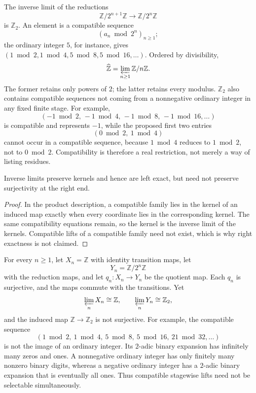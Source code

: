 \begin{example}
The inverse limit of the reductions
\[
\mathbb Z/2^{n+1}\mathbb Z\longrightarrow\mathbb Z/2^n\mathbb Z
\]
is \(\mathbb Z_2\).  An element is a compatible sequence
\[
(a_n\bmod2^n)_{n\geq1};
\]
the ordinary integer \(5\), for instance, gives
\((1\bmod2,1\bmod4,5\bmod8,5\bmod16,\ldots)\).  Ordered by divisibility,
\[
\widehat{\mathbb Z}=\varprojlim_{n\geq1}\mathbb Z/n\mathbb Z.
\]
The former retains only powers of \(2\); the latter retains every modulus.
\(\mathbb Z_2\) also contains compatible sequences not coming from a
nonnegative ordinary integer in any fixed finite stage.  For example,
\[
(-1\bmod2,\,-1\bmod4,\,-1\bmod8,\,-1\bmod16,\ldots)
\]
is compatible and represents \(-1\), while the proposed first two entries
\[
(0\bmod2,\ 1\bmod4)
\]
cannot occur in a compatible sequence, because \(1\bmod4\) reduces to
\(1\bmod2\), not to \(0\bmod2\).  Compatibility is therefore a real
restriction, not merely a way of listing residues.
\end{example}

\begin{proposition}
Inverse limits preserve kernels and hence are left exact, but need not
preserve surjectivity at the right end.
\end{proposition}
\begin{proof}
In the product description, a compatible family lies in the kernel of an
induced map exactly when every coordinate lies in the corresponding kernel.
The same compatibility equations remain, so the kernel is the inverse limit
of the kernels.  Compatible lifts of a compatible family need not exist,
which is why right exactness is not claimed.
\end{proof}

\begin{example}
For every \(n\geq1\), let \(X_n=\mathbb Z\) with identity transition maps,
let
\[
Y_n=\mathbb Z/2^n\mathbb Z
\]
with the reduction maps, and let \(q_n:X_n\to Y_n\) be the quotient map.
Each \(q_n\) is surjective, and the maps commute with the transitions.  Yet
\[
\varprojlim_nX_n\cong\mathbb Z,
\qquad
\varprojlim_nY_n\cong\mathbb Z_2,
\]
and the induced map \(\mathbb Z\to\mathbb Z_2\) is not surjective.  For
example, the compatible sequence
\[
(1\bmod2,\ 1\bmod4,\ 5\bmod8,\ 5\bmod16,\ 21\bmod32,\ldots)
\]
is not the image of an ordinary integer.  Its \(2\)-adic binary expansion has
infinitely many zeros and ones.  A nonnegative ordinary integer has only
finitely many nonzero binary digits, whereas a negative ordinary integer has a
\(2\)-adic binary expansion that is eventually all ones.  Thus compatible
stagewise lifts need not be selectable simultaneously.
\end{example}

